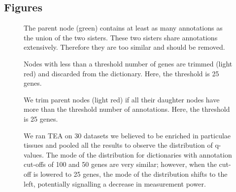 \documentclass[linenumbers, doublespacing]{bmcart}
\begin{document}
\begin{backmatter}

\section*{Figures}

  \begin{figure}[h!]
  \caption{
      The parent node (green) contains at least as many annotations as the union of the two sisters.
	  These two sisters share annotations extensively. Therefore they are too similar and should be removed.
	  }
	  \label{fig:simdiagram}
  \end{figure}

\begin{figure}[h!]
  \caption{
      Nodes with less than a threshold number of genes are trimmed (light red) and discarded from the dictionary. Here, the threshold is 25 genes.}
	  \label{fig:trim_ends}
      \end{figure}
	  
\begin{figure}[h!]
  \caption{
      We trim parent nodes (light red) if all their daughter nodes have more than the threshold number of annotations. Here, the threshold is 25 genes.}
	  \label{fig:trim_roots}
      \end{figure}


\begin{figure}[h!]
  \caption{
      }
	  \label{fig:GUI}
	  
      \end{figure}
\begin{figure}[h!]
  \caption{
      }
	  \label{fig:GUIresults}
      \end{figure}


\begin{figure}[h!]
  \caption{
      We ran TEA on 30 datasets we believed to be enriched in particulae tissues and pooled all the results to observe the distribution of q-values. The mode of the distribution for dictionaries with annotation cut-offs of 100 and 50 genes are very similar; however, when the cut-off is lowered to 25 genes, the mode of the distribution shifts to the left, potentially signalling a decrease in measurement power.}
	  \label{fig:qvals}
      \end{figure}


\end{backmatter}
\end{document}
